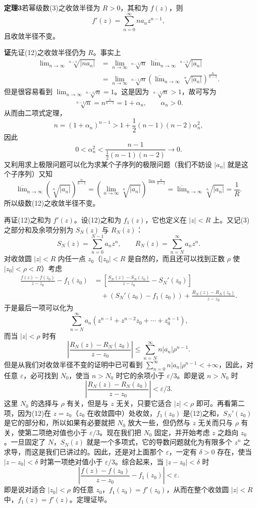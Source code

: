 \noindent\textbf{定理3}\quad 若幂级数(3)之收敛半径为 $R>0$，其和为 $f(z)$，则
\begin{equation}
 f'(z)=\sum_{n=0}^{\infty}na_nz^{n-1},
 \tag{12}
\end{equation}
且收敛半径不变。

\noindent\textbf{证}\quad 先证(12)之收敛半径仍为 $R$。事实上
\[
\begin{aligned}
 \overline{\lim}_{n\to\infty}\sqrt[n-1]{|na_n|}
 &=\lim_{n\to\infty}\sqrt[n-1]{n}\;
   \overline{\lim}_{n\to\infty}\sqrt[n-1]{|a_n|}\\
 &=\lim_{n\to\infty}\sqrt[n-1]{n}
   \left(\overline{\lim}_{n\to\infty}\sqrt[n]{|a_n|}\right)^{\frac n{n-1}}.
\end{aligned}
\]
但是很容易看到 $\lim_{n\to\infty}\sqrt[n-1]{n}=1$。这是因为 $\sqrt[n-1]{n}>1$，故可写为
\[
 \sqrt[n-1]{n}=n^{\frac1{n-1}}=1+\alpha_n,\qquad \alpha_n>0.
\]
从而由二项式定理，
\[
 n=(1+\alpha_n)^{n-1}>1+\frac12(n-1)(n-2)\alpha_n^2,
\]
因此
\[
 0<\alpha_n^2<\frac{n-1}{\frac12(n-1)(n-2)}\to0.
\]
又利用求上极限问题可以化为求某个子序列的极限问题（我们不妨设 $|a_n|$ 就是这个子序列）又知
\[
 \overline{\lim}_{n\to\infty}\left(\sqrt[n]{|a_n|}\right)^{\frac n{n-1}}
 =\left(\lim_{n\to\infty}\sqrt[n]{|a_n|}\right)^{\lim\frac n{n-1}}
 =\overline{\lim}_{n\to\infty}\sqrt[n]{|a_n|}=\frac1R.
\]
所以级数(12)之收敛半径不变。

再证(12)之和为 $f'(z)$。设(12)之和为 $f_1(z)$，它也定义在 $|z|<R$ 上。又记(3)之部分和及余项分别为 $S_N(z)$ 与 $R_N(z)$：
\[
 S_N(z)=\sum_{n=0}^{N-1}a_nz^n,\qquad R_N(z)=\sum_{n=N}^{\infty}a_nz^n.
\]
对收敛圆 $|z|<R$ 内任一点 $z_0$（$|z_0|<R$ 是自然的，而且还可以找到正数 $\rho$ 使 $|z_0|<\rho<R$）考虑
\[
\begin{aligned}
 \frac{f(z)-f(z_0)}{z-z_0}-f_1(z_0)
 &=\left[\frac{S_N(z)-S_N(z_0)}{z-z_0}-S_N'(z_0)\right]\\
 &\quad +(S_N'(z_0)-f_1(z_0))
 +\frac{R_N(z)-R_N(z_0)}{z-z_0}.
\end{aligned}
\]
于是最后一项可以化为
\[
 \sum_{n=N}^{\infty}a_n(z^{n-1}+z^{n-2}z_0+\cdots+z_0^{n-1}),
\]
而当 $|z|<\rho$ 时有
\[
 \left|\frac{R_N(z)-R_N(z_0)}{z-z_0}\right|
 \le\sum_{n=N}^{\infty}n|a_n|\rho^{n-1}.
\]
但是从我们对收敛半径不变的证明中已可看到 $\sum_{n=0}^{\infty}n|a_n|\rho^{n-1}<+\infty$，因此，对任意 $\varepsilon$，必可找到 $N_0$，使当 $n>N_0$ 时它的余项小于 $\varepsilon/3$。即是说 $n>N_0$ 时
\[
 \left|\frac{R_N(z)-R_N(z_0)}{z-z_0}\right|<\varepsilon/3.
\]
这里 $N_0$ 的选择与 $\rho$ 有关，但是与 $z$ 无关，只要它适合 $|z|<\rho$ 即可。再看第二项，因为(12)在 $z=z_0$（$z_0$ 在收敛圆中）处收敛，$f_1(z_0)$ 是(12)之和，$S_N'(z_0)$ 是它的部分和，所以如果有必要就把 $N_0$ 放大一些，但仍然与 $z$ 无关而只与 $\rho$ 有关，使第二项绝对值也小于 $\varepsilon/3$。现在我们把 $N_0$ 固定，并开始考虑 $z$ 之趋向 $z_0$。一旦固定了 $N$，$S_N(z)$ 就是一个多项式，它的导数问题就化为有限多个 $z^n$ 之求导，而这是我们已讲过的。因此，还是对上面那个 $\varepsilon$，一定有 $\delta>0$ 存在，使当 $|z-z_0|<\delta$ 时第一项绝对值小于 $\varepsilon/3$。综合起来，当 $|z-z_0|<\delta$ 时
\[
 \left|\frac{f(z)-f(z_0)}{z-z_0}-f_1(z_0)\right|<\varepsilon.
\]
即是说对适合 $|z_0|<\rho$ 的任意 $z_0$，$f_1(z_0)=f'(z_0)$，从而在整个收敛圆 $|z|<R$ 中，$f_1(z)=f'(z)$。定理证毕。

